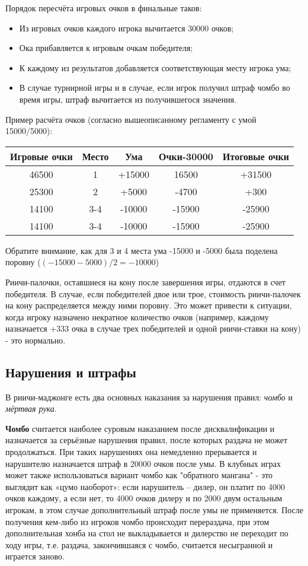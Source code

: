 Порядок пересчёта игровых очков в финальные таков:
\begin{itemize}
	\item Из игровых очков каждого игрока вычитается 30000 очков;
	\item Ока прибавляется к игровым очкам победителя;
	\item К каждому из результатов добавляется соответствующая месту игрока ума;
	\item В случае турнирной игры и в случае, если игрок получил штраф чомбо во время игры, штраф вычитается из получившегося значения.
\end{itemize}

Пример расчёта очков (согласно вышеописанному регламенту с умой 15000/5000):

\begin{tabular}{|c|c|c|c|c|}
	\hline
	Игровые очки & Место & Ума & Очки-30000 & Итоговые очки \\	
	\hline
	46500 & 1 & +15000 & 16500 & +31500 \\
	\hline
	25300 & 2 & +5000 & -4700 & +300 \\
	\hline
	14100 & 3-4 & -10000 & -15900 & -25900 \\
	\hline
	14100 & 3-4 & -10000 & -15900 & -25900 \\
	\hline
\end{tabular}

Обратите внимание, как для 3 и 4 места ума -15000 и -5000 была поделена поровну (\begin{math}(-15000-5000)/2 = -10000\end{math})

Риичи-палочки, оставшиеся на кону после завершения игры, отдаются в счет победителя. В случае, если победителей двое или трое, стоимость риичи-палочек на кону распределяется между ними поровну. Это может привести к ситуации, когда игроку назначено некратное количество очков (например, каждому назначается +333 очка в случае трех победителей и одной риичи-ставки на кону) - это нормально.

\subsection{Нарушения и штрафы}

В риичи-маджонге есть два основных наказания за нарушения правил: \textit{чомбо} и \textit{мёртвая рука}.

\textbf{Чомбо} считается наиболее суровым наказанием после дисквалификации и назначается за серьёзные нарушения правил, после которых раздача не может продолжаться. При таких нарушениях она немедленно прерывается и нарушителю назначается штраф в 20000 очков после умы. В клубных играх может также использоваться вариант чомбо как "обратного мангана" - это выглядит как «цумо наоборот»: если нарушитель – дилер, он платит по 4000 очков каждому, а если нет, то 4000 очков дилеру и по 2000 двум остальным игрокам, в этом случае дополнительный штраф после умы не применяется. После получения кем-либо из игроков чомбо происходит перераздача, при этом дополнительная хонба на стол не выкладывается и дилерство не переходит по ходу игры, т.е. раздача, закончившаяся с чомбо, считается несыгранной и играется заново.

